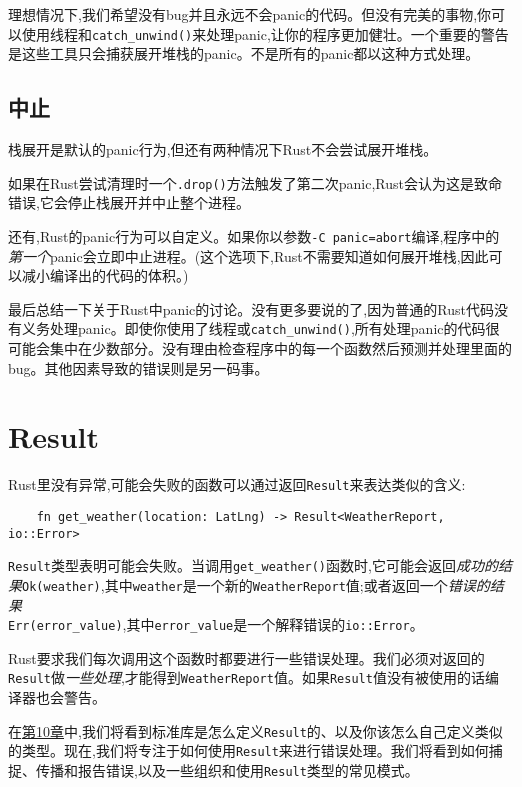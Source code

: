 理想情况下,我们希望没有bug并且永远不会panic的代码。但没有完美的事物,你可以使用线程和\texttt{catch\_unwind()}来处理panic,让你的程序更加健壮。一个重要的警告是这些工具只会捕获展开堆栈的panic。不是所有的panic都以这种方式处理。

\subsection{中止}
栈展开是默认的panic行为,但还有两种情况下Rust不会尝试展开堆栈。

如果在Rust尝试清理时一个\texttt{.drop()}方法触发了第二次panic,Rust会认为这是致命错误,它会停止栈展开并中止整个进程。

还有,Rust的panic行为可以自定义。如果你以参数\texttt{-C panic=abort}编译,程序中的\emph{第一个}panic会立即中止进程。(这个选项下,Rust不需要知道如何展开堆栈,因此可以减小编译出的代码的体积。)

最后总结一下关于Rust中panic的讨论。没有更多要说的了,因为普通的Rust代码没有义务处理panic。即使你使用了线程或\texttt{catch\_unwind()},所有处理panic的代码很可能会集中在少数部分。没有理由检查程序中的每一个函数然后预测并处理里面的bug。其他因素导致的错误则是另一码事。

\section{Result}

Rust里没有异常,可能会失败的函数可以通过返回\texttt{Result}来表达类似的含义:
\begin{verbatim}
    fn get_weather(location: LatLng) -> Result<WeatherReport, io::Error>
\end{verbatim}
\texttt{Result}类型表明可能会失败。当调用\texttt{get\_weather()}函数时,它可能会返回\emph{成功的结果}\texttt{Ok(weather)},其中\texttt{weather}是一个新的\texttt{WeatherReport}值;或者返回一个\emph{错误的结果}\\
\texttt{Err(error\_value)},其中\texttt{error\_value}是一个解释错误的\texttt{io::Error}。

Rust要求我们每次调用这个函数时都要进行一些错误处理。我们必须对返回的\texttt{Result}做\emph{一些处理},才能得到\texttt{WeatherReport}值。如果\texttt{Result}值没有被使用的话编译器也会警告。

在\hyperref[ch10]{第10章}中,我们将看到标准库是怎么定义\texttt{Result}的、以及你该怎么自己定义类似的类型。现在,我们将专注于如何使用\texttt{Result}来进行错误处理。我们将看到如何捕捉、传播和报告错误,以及一些组织和使用\texttt{Result}类型的常见模式。

